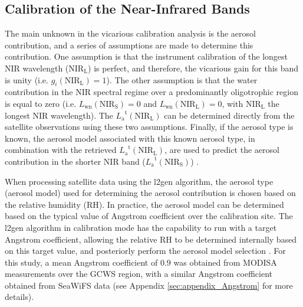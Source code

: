 \documentclass[]{interact}
\theoremstyle{plain}%
\theoremstyle{definition}
\theoremstyle{remark}
\begin{document}
\subsection{Calibration of the Near-Infrared Bands}
\label{sec:vcal_nir}
The main unknown in the vicarious calibration analysis is the aerosol contribution, and a series of assumptions are made to determine this contribution. One assumption is that the instrument calibration of the longest NIR wavelength ($\text{NIR}_\text{L}$) is perfect, and therefore, the vicarious gain for this band is unity (i.e. $g_i(\text{NIR}_\text{L})=1$). The other assumption is that the water contribution in the NIR spectral regime over a predominantly oligotrophic region is equal to zero (i.e. $L_\text{wn}(\text{NIR}_\text{S})=0$ and $L_\text{wn}(\text{NIR}_\text{L})=0$, with $\text{NIR}_\text{L}$ the longest NIR wavelength). The ${L_\text{a}}^\text{t}(\text{NIR}_\text{L})$ can be determined directly from the satellite observations using these two assumptions. Finally, if the aerosol type is known, the aerosol model associated with this known aerosol type, in combination with the retrieved ${L_\text{a}}^\text{t}(\text{NIR}_\text{L})$, are used to predict the aerosol contribution in the shorter NIR band (${L_\text{a}}^\text{t}(\text{NIR}_\text{S})$) \citep{Franz:07}. 

When processing satellite data using the l2gen algorithm, the aerosol type (aerosol model) used for determining the aerosol contribution is chosen based on the relative humidity (RH). In practice, the aerosol model can be determined based on the typical value of Angstrom coefficient over the calibration site. The l2gen algorithm in calibration mode has the capability to run with a target Angstrom coefficient, allowing the relative RH to be determined internally based on this target value, and posteriorly perform the aerosol model selection \citep{Ahmad2010,Mobley2016}. For this study, a mean Angstrom coefficient of $0.9$ was obtained from MODISA measurements over the GCWS region, with a similar Angstrom coefficient obtained from SeaWiFS data (see Appendix \ref{sec:appendix_Angstrom} for more details).
\end{document}
